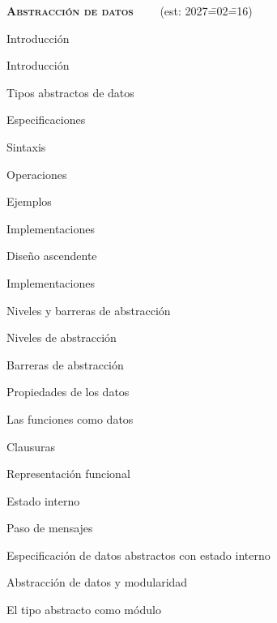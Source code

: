 \begin{longenum}
\begin{longenum}
    \end{longenum}
    \item \textbf{\textsc{Abstracción de datos}} \ \ \ \ (est: 2027\==02\==16)
    \begin{longenum}
        \item Introducción
        \begin{longenum}
            \item Introducción
            \item Tipos abstractos de datos
        \end{longenum}
        \item Especificaciones
        \begin{longenum}
            \item Sintaxis
            \item Operaciones
            \item Ejemplos
        \end{longenum}
        \item Implementaciones
        \begin{longenum}
            \item Diseño ascendente
            \item Implementaciones
        \end{longenum}
        \item Niveles y barreras de abstracción
        \begin{longenum}
            \item Niveles de abstracción
            \item Barreras de abstracción
            \item Propiedades de los datos
        \end{longenum}
        \item Las funciones como datos
        \begin{longenum}
            \item Clausuras
            \item Representación funcional
            \item Estado interno
            \item Paso de mensajes
            \item Especificación de datos abstractos con estado interno
        \end{longenum}
        \item Abstracción de datos y modularidad
        \begin{longenum}
            \item El tipo abstracto como módulo

\end{longenum}
\end{longenum}
\end{longenum}
